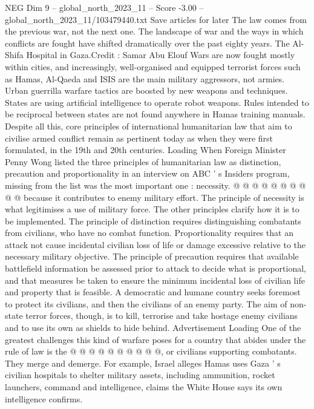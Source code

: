 \begin{textsample}{NEG Dim 9 – global\_north\_2023\_11 – Score -3.00 – global\_north\_2023\_11/103479440.txt}  \label{ex:f9_neg_298}
Save articles for later The law comes from the previous war, not the next one.
The landscape of war and the ways in which conflicts are fought have shifted dramatically over the past eighty years.
The Al-Shifa Hospital in Gaza.Credit : Samar Abu Elouf Wars are now fought mostly within cities, and increasingly, well-organised and equipped terrorist forces such as Hamas, Al-Qaeda and ISIS are the main military aggressors, not armies.
Urban guerrilla warfare tactics are boosted by new weapons and techniques.
States are using artificial intelligence to operate robot weapons.
Rules intended to be reciprocal between states are not found anywhere in Hamas training manuals.
Despite all this, core principles of international humanitarian law that aim to civilise armed conflict remain as pertinent today as when they were first formulated, in the 19th and 20th centuries.
Loading When Foreign Minister Penny Wong listed the three principles of humanitarian law as distinction, precaution and proportionality in an interview on ABC ' s Insiders program, missing from the list was the most important one : necessity. @ @ @ @ @ @ @ @ @ @ because it contributes to enemy military effort.
The principle of necessity is what legitimises a use of military force.
The other principles clarify how it is to be implemented.
The principle of distinction requires distinguishing combatants from civilians, who have no combat function.
Proportionality requires that an attack not cause incidental civilian loss of life or damage excessive relative to the necessary military objective.
The principle of precaution requires that available battlefield information be assessed prior to attack to decide what is proportional, and that measures be taken to ensure the minimum incidental loss of civilian life and property that is feasible.
A democratic and humane country seeks foremost to protect its civilians, and then the civilians of an enemy party.
The aim of non-state terror forces, though, is to kill, terrorise and take hostage enemy civilians and to use its own as shields to hide behind.
Advertisement Loading One of the greatest challenges this kind of warfare poses for a country that abides under the rule of law is the @ @ @ @ @ @ @ @ @ @, or civilians supporting combatants.
They merge and demerge.
For example, Israel alleges Hamas uses Gaza ' s civilian hospitals to shelter military assets, including ammunition, rocket launchers, command and intelligence, claims the White House says its own intelligence confirms.

\end{textsample}
